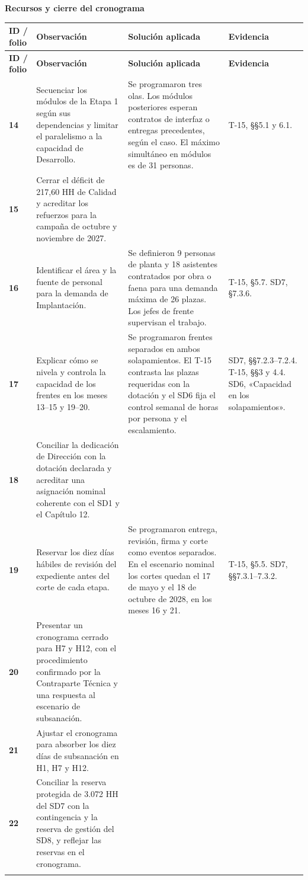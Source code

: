 \documentclass[11pt,letterpaper]{article}
\makeatletter
\newcommand{\tema}[1]{\par{\Large\bfseries #1}\par}
\newcommand{\cabecera}{\rowcolor{fondo}
  \textbf{ID / folio} & \textbf{Observación} & \textbf{Solución aplicada} & \textbf{Evidencia}\\}
\newenvironment{matriz}{%
  \fontsize{10}{13}\selectfont
  \begin{longtable}{@{}>{\RaggedRight\arraybackslash}p{.099\linewidth}
                      >{\RaggedRight\arraybackslash}p{.360\linewidth}
                      >{\RaggedRight\arraybackslash}p{.329\linewidth}
                      >{\RaggedRight\arraybackslash}p{.152\linewidth}@{}}
    \cabecera\endfirsthead
    \cabecera\endhead
}{\end{longtable}\normalsize}
\newcommand{\observacion}[5]{%
  \rule{0pt}{2.3ex}\textbf{#1}\newline {\footnotesize #2} &
  #3 & #4 & #5 \\[2pt]\arrayrulecolor{regla}\midrule}
\makeatother
\begin{document}
\newpage
\tema{Recursos y cierre del cronograma}
\begin{matriz}
\observacion{14}{29--30, 33, 54}
{Secuenciar los módulos de la Etapa 1 según sus dependencias y limitar el paralelismo a la capacidad de Desarrollo.}
{Se programaron tres olas. Los módulos posteriores esperan contratos de interfaz o entregas precedentes, según el caso. El máximo simultáneo en módulos es de 31 personas.}
{T-15, §§5.1 y 6.1.}
\observacion{15}{29--30, 33, 53}
{Cerrar el déficit de 217,60 HH de Calidad y acreditar los refuerzos para la campaña de octubre y noviembre de 2027.}{}{}
\observacion{16}{29--30, 33}
{Identificar el área y la fuente de personal para la demanda de Implantación.}
{Se definieron 9 personas de planta y 18 asistentes contratados por obra o faena para una demanda máxima de 26 plazas. Los jefes de frente supervisan el trabajo.}
{T-15, §5.7. SD7, §7.3.6.}
\observacion{17}{24, 28}
{Explicar cómo se nivela y controla la capacidad de los frentes en los meses 13--15 y 19--20.}
{Se programaron frentes separados en ambos solapamientos. El T-15 contrasta las plazas requeridas con la dotación y el SD6 fija el control semanal de horas por persona y el escalamiento.}
{SD7, §§7.2.3--7.2.4. T-15, §§3 y 4.4. SD6, «Capacidad en los solapamientos».}
\observacion{18}{29--30, 33}
{Conciliar la dedicación de Dirección con la dotación declarada y acreditar una asignación nominal coherente con el SD1 y el Capítulo 12.}{}{}
\observacion{19}{29, 32--33, 54}
{Reservar los diez días hábiles de revisión del expediente antes del corte de cada etapa.}
{Se programaron entrega, revisión, firma y corte como eventos separados. En el escenario nominal los cortes quedan el 17 de mayo y el 18 de octubre de 2028, en los meses 16 y 21.}
{T-15, §5.5. SD7, §§7.3.1--7.3.2.}
\observacion{20}{29, 32--33, 54}
{Presentar un cronograma cerrado para H7 y H12, con el procedimiento confirmado por la Contraparte Técnica y una respuesta al escenario de subsanación.}{}{}
\observacion{21}{41}
{Ajustar el cronograma para absorber los diez días de subsanación en H1, H7 y H12.}{}{}
\observacion{22}{36--38, 53}
{Conciliar la reserva protegida de 3.072 HH del SD7 con la contingencia y la reserva de gestión del SD8, y reflejar las reservas en el cronograma.}{}{}
\end{matriz}
\end{document}
